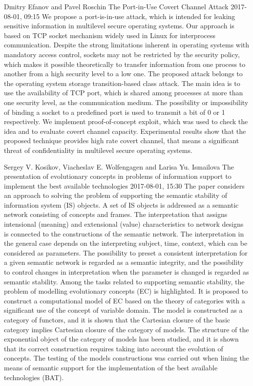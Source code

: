 \documentclass[10pt,fleqn,openany]{book} %
\begin{document}
\begin{enumerate}
		
		\paperabstract
		{Dmitry Efanov and Pavel Roschin}
		{The Port-in-Use Covert Channel Attack}
		{2017-08-01, 09:15}
		{We propose a port-is-in-use attack, which is intended for leaking sensitive information in multilevel secure operating systems. Our approach is based on TCP socket mechanism widely used in Linux for interprocess communication. Despite the strong limitations inherent in operating systems with mandatory access control, sockets may not be restricted by the security policy, which makes it possible theoretically to transfer information from one process to another from a high security level to a low one. The proposed attack belongs to the operating system storage transition-based class attack. The main idea is to use the availability of TCP port, which is shared among processes at more than one security level, as the communication medium. The possibility or impossibility of binding a socket to a predefined port is used to transmit a bit of 0 or 1 respectively. We implement proof-of-concept exploit, which was used to check the idea and to evaluate covert channel capacity. Experimental results show that the proposed technique provides high rate covert channel, that means a significant threat of confidentiality in multilevel secure operating systems.}
		
		
		\paperabstract
		{Sergey V. Kosikov, Viacheslav E. Wolfengagen and Larisa Yu. Ismailova}
		{The presentation of evolutionary concepts in problems of information support to implement the best available technologies}
		{2017-08-01, 15:30}
		{The paper considers an approach to solving the problem of supporting the semantic stability of information system (IS) objects. A set of IS objects is addressed as a semantic network consisting of concepts and frames. The interpretation that assigns intensional (meaning) and extensional (value) characteristics to network designs is connected to the constructions of the semantic network. The interpretation in the general case depends on the interpreting subject, time, context, which can be considered as parameters. The possibility to preset a consistent interpretation for a given semantic network is regarded as a semantic integrity, and the possibility to control changes in interpretation when the parameter is changed is regarded as semantic stability. Among the tasks related to supporting semantic stability, the problem of modelling evolutionary concepts (EC) is highlighted. It is proposed to construct a computational model of EC based on the theory of categories with a significant use of the concept of variable domain. The model is constructed as a category of functors, and it is shown that the Cartesian closure of the basic category implies Cartesian closure of the category of models. The structure of the exponential object of the category of models has been studied, and it is shown that its correct construction requires taking into account the evolution of concepts. The testing of the models constructions was carried out when lining the means of semantic support for the implementation of the best available technologies (BAT).}
		

\end{enumerate}
\end{document}
